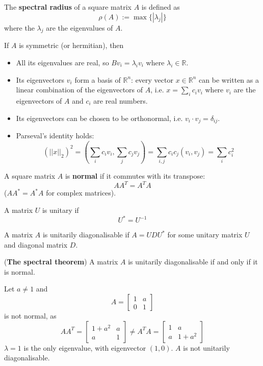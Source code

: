 \begin{definition}
	The \textbf{spectral radius} of a square matrix $A$ is defined as
	\[
		\rho(A) := \max \{ |\lambda_j| \}
	\]
	where the $\lambda_j$ are the eigenvalues of $A$.
\end{definition}

\begin{proposition}\label{prop:symmetricMatrixProperties}
	If $A$ is symmetric (or hermitian), then
	\begin{itemize}
		\item All its eigenvalues are real, so $B v_i = \lambda_i v_i$ where $\lambda_i \in \mathbb{R}$.
		\item Its eigenvectors $v_i$ form a basis of $\mathbb{R}^n$: every vector $x \in \mathbb{R}^n$ can be written as a linear combination of the eigenvectors of $A$, i.e. $x = \sum_i c_i v_i$ where $v_i$ are the eigenvectors of $A$ and $c_i$ are real numbers.
		\item Its eigenvectors can be chosen to be orthonormal, i.e. $v_i \cdot v_j = \delta_{ij}$.
		\item Parseval's identity holds:
		\[
			{(||x||_2)}^2 = \left( \sum_i c_i v_i, \sum_j c_j v_j \right) = \sum_{i, j} c_i c_j (v_i, v_j) = \sum_i c_i^2
		\]
	\end{itemize}
\end{proposition}

\begin{definition}
	A square matrix $A$ is \textbf{normal} if it commutes with its transpose:
	\[
		A A^T = A^T A
	\]
	($A A^* = A^* A$ for complex matrices).
\end{definition}

\begin{definition}
	A matrix $U$ is unitary if
	\[
		U^* = U^{-1}
	\]
\end{definition}

\begin{definition}
	A matrix $A$ is unitarily diagonalisable if $A = U D U^*$ for some unitary matrix $U$ and diagonal matrix $D$.
\end{definition}

\begin{theorem}
	(\textbf{The spectral theorem}) A matrix $A$ is unitarily diagonalisable if and only if it is normal.
\end{theorem}

\begin{example}
	Let $a \ne 1$ and
	\[
		A = \begin{bmatrix}
			1 & a \\
			0 & 1
		\end{bmatrix}
	\]
	is not normal, as
	\[
		A A^T = \begin{bmatrix}
			1 + a^2 & a \\
			a & 1
		\end{bmatrix}
		\ne
		A^T A = \begin{bmatrix}
			1 & a \\
			a & 1 + a^2
		\end{bmatrix}
	\]
	$\lambda = 1$ is the only eigenvalue, with eigenvector $(1, 0)$. $A$ is not unitarily diagonalisable.
\end{example}

